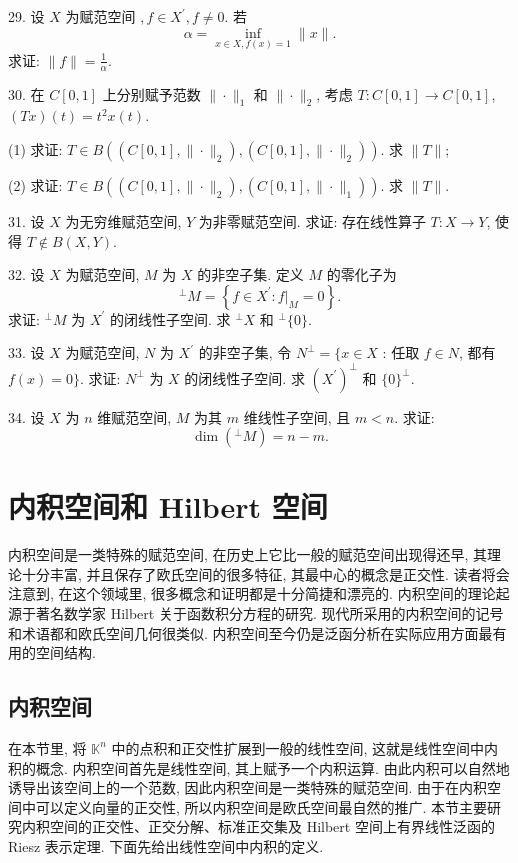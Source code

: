 \documentclass[openany]{ctexbook}
\theoremstyle{kaiti}
\theoremstyle{normal}
\begin{document}
29. 设 $X$ 为赋范空间 $, f \in X^{\prime}, f \neq 0$. 若
$$
\alpha=\inf_{x \in X, f(x)=1}\|x\|.
$$
求证: $\|f\|=\frac{1}{\alpha}$.

30. 在 $C[0,1]$ 上分别赋予范数 $\|\cdot\|_1$ 和 $\|\cdot\|_2$, 考虑 $T: C[0,1] \rightarrow C[0,1]$, $(T x)(t)=t^2 x(t)$.

(1) 求证: $T \in B\left(\left(C[0,1],\|\cdot\|_2\right),\left(C[0,1],\|\cdot\|_2\right)\right)$. 求 $\|T\|$;

(2) 求证: $T \in B\left(\left(C[0,1],\|\cdot\|_2\right),\left(C[0,1],\|\cdot\|_1\right)\right)$. 求 $\|T\|$.

31. 设 $X$ 为无穷维赋范空间, $Y$ 为非零赋范空间. 求证: 存在线性算子 $T: X \rightarrow Y$, 使得 $T \notin B(X, Y)$.

32. 设 $X$ 为赋范空间, $M$ 为 $X$ 的非空子集. 定义 $M$ 的零化子为
$$
{ }^{\perp} M=\left\{f \in X^{\prime}:\left.f\right|_{M}=0\right\}.
$$
求证: ${ }^{\perp} M$ 为 $X^{\prime}$ 的闭线性子空间. 求 ${ }^{\perp} X$ 和 $^{\perp}\{0\}$.

33. 设 $X$ 为赋范空间, $N$ 为 $X^{\prime}$ 的非空子集, 令
$N^{\perp}=\{x \in X$ : 任取 $f \in N$, 都有 $f(x)=0\}$.
求证: $N^{\perp}$ 为 $X$ 的闭线性子空间. 求 $\left(X^{\prime}\right)^{\perp}$ 和 $\{0\}^{\perp}$.

34. 设 $X$ 为 $n$ 维赋范空间, $M$ 为其 $m$ 维线性子空间, 且 $m<n$. 求证:
$$
\operatorname{dim}\left({ }^{\perp} M\right)=n-m.
$$

\chapter{内积空间和 Hilbert 空间}

内积空间是一类特殊的赋范空间, 在历史上它比一般的赋范空间出现得还早, 其理论十分丰富, 并且保存了欧氏空间的很多特征, 其最中心的概念是正交性. 读者将会注意到, 在这个领域里, 很多概念和证明都是十分简捷和漂亮的. 内积空间的理论起源于著名数学家 Hilbert 关于函数积分方程的研究. 现代所采用的内积空间的记号和术语都和欧氏空间几何很类似. 内积空间至今仍是泛函分析在实际应用方面最有用的空间结构.

\section{内积空间}

在本节里, 将 $\mathbb{K}^n$ 中的点积和正交性扩展到一般的线性空间, 这就是线性空间中内积的概念. 内积空间首先是线性空间, 其上赋予一个内积运算. 由此内积可以自然地诱导出该空间上的一个范数, 因此内积空间是一类特殊的赋范空间. 由于在内积空间中可以定义向量的正交性, 所以内积空间是欧氏空间最自然的推广. 本节主要研究内积空间的正交性、正交分解、标准正交集及 Hilbert 空间上有界线性泛函的 Riesz 表示定理. 下面先给出线性空间中内积的定义.
\end{document}
